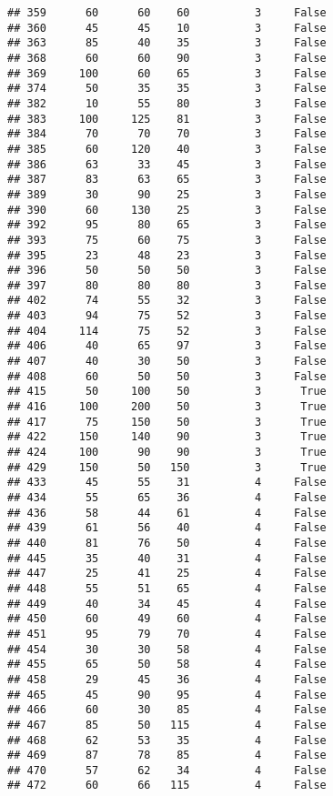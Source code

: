 \documentclass[
]{article}
\begin{document}
\begin{verbatim}
## 359      60      60    60          3     False
## 360      45      45    10          3     False
## 363      85      40    35          3     False
## 368      60      60    90          3     False
## 369     100      60    65          3     False
## 374      50      35    35          3     False
## 382      10      55    80          3     False
## 383     100     125    81          3     False
## 384      70      70    70          3     False
## 385      60     120    40          3     False
## 386      63      33    45          3     False
## 387      83      63    65          3     False
## 389      30      90    25          3     False
## 390      60     130    25          3     False
## 392      95      80    65          3     False
## 393      75      60    75          3     False
## 395      23      48    23          3     False
## 396      50      50    50          3     False
## 397      80      80    80          3     False
## 402      74      55    32          3     False
## 403      94      75    52          3     False
## 404     114      75    52          3     False
## 406      40      65    97          3     False
## 407      40      30    50          3     False
## 408      60      50    50          3     False
## 415      50     100    50          3      True
## 416     100     200    50          3      True
## 417      75     150    50          3      True
## 422     150     140    90          3      True
## 424     100      90    90          3      True
## 429     150      50   150          3      True
## 433      45      55    31          4     False
## 434      55      65    36          4     False
## 436      58      44    61          4     False
## 439      61      56    40          4     False
## 440      81      76    50          4     False
## 445      35      40    31          4     False
## 447      25      41    25          4     False
## 448      55      51    65          4     False
## 449      40      34    45          4     False
## 450      60      49    60          4     False
## 451      95      79    70          4     False
## 454      30      30    58          4     False
## 455      65      50    58          4     False
## 458      29      45    36          4     False
## 465      45      90    95          4     False
## 466      60      30    85          4     False
## 467      85      50   115          4     False
## 468      62      53    35          4     False
## 469      87      78    85          4     False
## 470      57      62    34          4     False
## 472      60      66   115          4     False

\end{verbatim}
\end{document}
